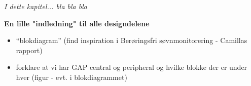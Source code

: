 \textit{I dette kapitel... bla bla bla}

\textbf{En lille "indledning" til alle designdelene}
\begin{itemize}
\item “blokdiagram” (find inspiration i Berøringsfri søvnmonitorering - Camillas rapport)
\item forklare at vi har GAP central og peripheral og hvilke blokke der er under hver (figur - evt. i blokdiagrammet)
\end{itemize}
